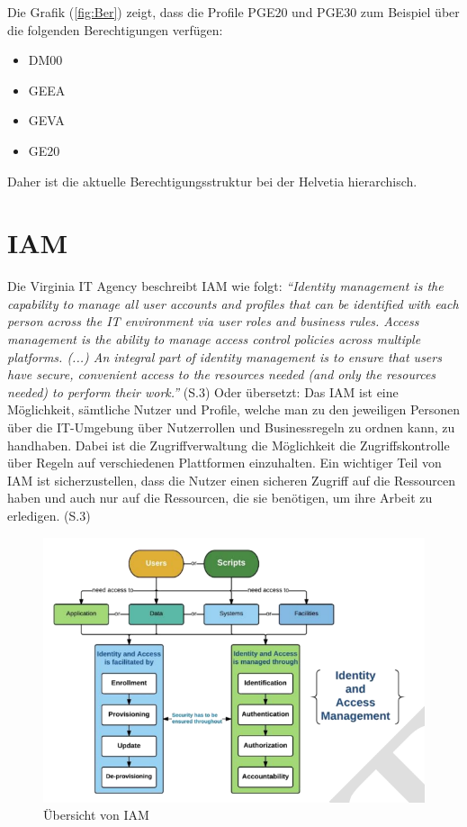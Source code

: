 \newpage
Die Grafik (\ref{fig:Ber}) zeigt, dass die Profile PGE$20$ und PGE$30$ zum Beispiel über die folgenden Berechtigungen verfügen:
\begin{itemize}
	\item DM$00$
	\item GEEA
	\item GEVA
	\item GE$20$
\end{itemize}
Daher ist die aktuelle Berechtigungsstruktur bei der Helvetia hierarchisch.

\section{IAM}
\label{subsec:IAM}
Die Virginia IT Agency beschreibt IAM wie folgt: \textit{"`Identity management is the capability to manage all user accounts and profiles that can be identified with each person across the IT environment via user roles and business rules. Access management is the ability to manage access control policies across multiple platforms. (...) An integral part of identity management is to ensure that users have secure, convenient access to the resources needed (and only the resources needed) to perform their work."'} \cite{Virg07} (S.3)
\newline
\newline
Oder übersetzt:
\newline
\newline
Das \ac{IAM} ist eine Möglichkeit, sämtliche Nutzer und Profile, welche man zu den jeweiligen Personen über die IT-Umgebung über Nutzerrollen und Businessregeln zu ordnen kann, zu handhaben. Dabei ist die Zugriffverwaltung die Möglichkeit die Zugriffskontrolle über Regeln auf verschiedenen Plattformen einzuhalten. Ein wichtiger Teil von \ac{IAM} ist sicherzustellen, dass die Nutzer einen sicheren Zugriff auf die Ressourcen haben und auch nur auf die Ressourcen, die sie benötigen, um ihre Arbeit zu erledigen. \cite{Virg07} (S.3)
\begin{figure}[h!]
 \centering
 \includegraphics[width=1\textwidth]{gfx/Picture/IAM.PNG}
 \caption{Übersicht von IAM \cite{Moha19}}
 \label{fig:IAM}
\end{figure}

